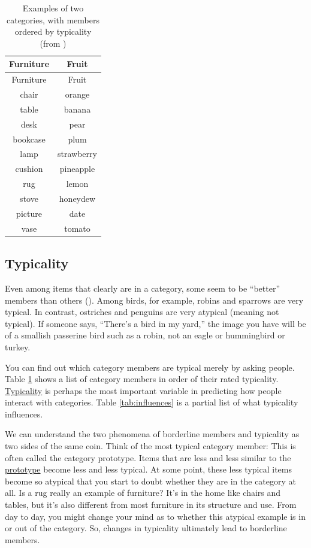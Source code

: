 \documentclass[
]{krantz}
\begin{document}
\begin{longtable}[]{@{}cc@{}}
\caption{\label{tab:typicality} Examples of two categories, with members ordered by typicality (from )}\tabularnewline
\toprule\noalign{}
Furniture & Fruit \\
\midrule\noalign{}
\endfirsthead
\toprule\noalign{}
Furniture & Fruit \\
\midrule\noalign{}
\endhead
\bottomrule\noalign{}
\endlastfoot
chair & orange \\
table & banana \\
desk & pear \\
bookcase & plum \\
lamp & strawberry \\
cushion & pineapple \\
rug & lemon \\
stove & honeydew \\
picture & date \\
vase & tomato \\
\end{longtable}

\subsection*{Typicality}\label{typicality}


Even among items that clearly are in a category, some seem to be ``better'' members than others (). Among birds, for example, robins and sparrows are very typical. In contrast, ostriches and penguins are very atypical (meaning not typical). If someone says, ``There's a bird in my yard,'' the image you have will be of a smallish passerine bird such as a robin, not an eagle or hummingbird or turkey.

You can find out which category members are typical merely by asking people. Table \ref{tab:typicality} shows a list of category members in order of their rated typicality. \hyperref[typicality]{Typicality} is perhaps the most important variable in predicting how people interact with categories. Table \ref{tab:influences} is a partial list of what typicality influences.

We can understand the two phenomena of borderline members and typicality as two sides of the same coin. Think of the most typical category member: This is often called the category prototype. Items that are less and less similar to the \hyperref[prototype-def]{prototype} become less and less typical. At some point, these less typical items become so atypical that you start to doubt whether they are in the category at all. Is a rug really an example of furniture? It's in the home like chairs and tables, but it's also different from most furniture in its structure and use. From day to day, you might change your mind as to whether this atypical example is in or out of the category. So, changes in typicality ultimately lead to borderline members.
\end{document}
